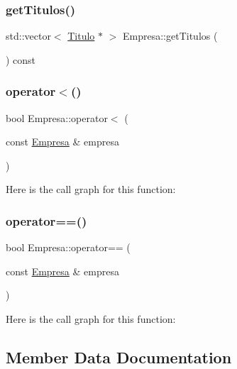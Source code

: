 \mbox{\label{class_empresa_a672f3a89b0e41dd758ab6baf1a8dfbd2}} 
\subsubsection{\texorpdfstring{get\+Titulos()}{getTitulos()}}
{\footnotesize\ttfamily std\+::vector$<$ \mbox{\hyperlink{class_titulo}{Titulo}} $\ast$ $>$ Empresa\+::get\+Titulos (\begin{DoxyParamCaption}{ }\end{DoxyParamCaption}) const}

\mbox{\label{class_empresa_ab643d752365e59fa1d90a41b8a036d6a}} 
\subsubsection{\texorpdfstring{operator$<$()}{operator<()}}
{\footnotesize\ttfamily bool Empresa\+::operator$<$ (\begin{DoxyParamCaption}\item[{const \mbox{\hyperlink{class_empresa}{Empresa}} \&}]{empresa }\end{DoxyParamCaption})}

Here is the call graph for this function\+:
\mbox{\label{class_empresa_ad915fb38bc6c73c02fe70c62db1c9f03}} 
\subsubsection{\texorpdfstring{operator==()}{operator==()}}
{\footnotesize\ttfamily bool Empresa\+::operator== (\begin{DoxyParamCaption}\item[{const \mbox{\hyperlink{class_empresa}{Empresa}} \&}]{empresa }\end{DoxyParamCaption})}

Here is the call graph for this function\+:


\subsection{Member Data Documentation}
\mbox{\label{class_empresa_ad6e0d3239991fec739d8af4fda632fb9}} 
